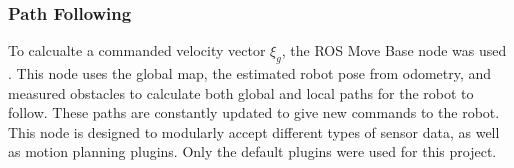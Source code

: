 \subsubsection{ Path Following }

To calcualte a commanded velocity vector $\xi_g$, the ROS Move Base node was used \cite{movebase}. This node uses the global map, the estimated robot pose from odometry, and measured obstacles to calculate both global and local paths for the robot to follow. These paths are constantly updated to give new commands to the robot. This node is designed to modularly accept different types of sensor data, as well as motion planning plugins. Only the default plugins were used for this project.
